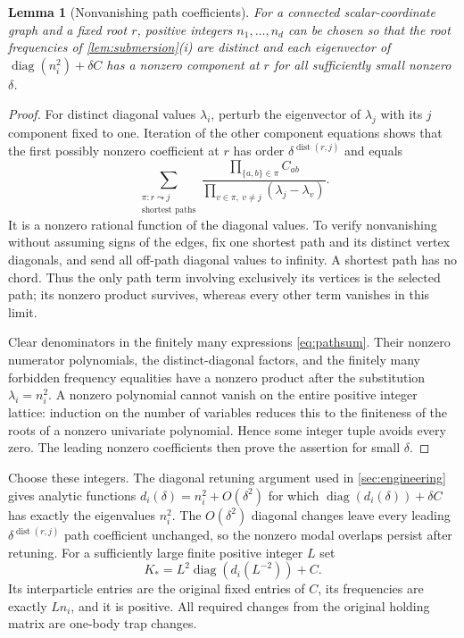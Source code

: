 \documentclass[11pt]{article}
\numberwithin{equation}{section}
\newtheorem{lemma}[lemma]{Lemma}
\theoremstyle{definition}
\newcommand{\diag}{\operatorname{diag}}
\begin{document}
\begin{lemma}[Nonvanishing path coefficients]\label{lem:paths}
For a connected scalar-coordinate graph and a fixed root $r$,
positive integers $n_1,\ldots,n_d$ can be chosen so that the
root frequencies of \cref{lem:submersion}(i) are distinct and
each eigenvector of
$\diag(n_i^2)+\delta C$ has a nonzero component at $r$ for all
sufficiently small nonzero $\delta$.
\end{lemma}

\begin{proof}
For distinct diagonal values $\lambda_i$, perturb the eigenvector
of $\lambda_j$ with its $j$ component fixed to one.
Iteration of the other component equations shows that the first
possibly nonzero coefficient at $r$ has order
$\delta^{\operatorname{dist}(r,j)}$ and equals
\begin{equation}\label{eq:pathsum}
 \sum_{\substack{\pi:r\leadsto j\\\text{shortest paths}}}
 \frac{\prod_{\{a,b\}\in\pi}C_{ab}}
      {\prod_{v\in\pi,\ v\ne j}(\lambda_j-\lambda_v)} .
\end{equation}
It is a nonzero rational function of the diagonal values.
To verify nonvanishing without assuming signs of the edges,
fix one shortest path and its distinct vertex diagonals, and
send all off-path diagonal values to infinity. A shortest path
has no chord. Thus the only path term involving exclusively its
vertices is the selected path; its nonzero product survives,
whereas every other term vanishes in this limit.

Clear denominators in the finitely many expressions
\eqref{eq:pathsum}. Their nonzero numerator polynomials, the
distinct-diagonal factors, and the finitely many forbidden
frequency equalities have a nonzero product after the
substitution $\lambda_i=n_i^2$. A nonzero polynomial cannot
vanish on the entire positive integer lattice: induction on the
number of variables reduces this to the finiteness of the roots
of a nonzero univariate polynomial. Hence some integer tuple
avoids every zero. The leading nonzero coefficients then prove
the assertion for small $\delta$.
\end{proof}

Choose these integers. The diagonal retuning argument used in
\cref{sec:engineering} gives analytic functions
$d_i(\delta)=n_i^2+O(\delta^2)$ for which
$\diag(d_i(\delta))+\delta C$ has exactly the eigenvalues
$n_i^2$. The $O(\delta^2)$ diagonal changes leave every leading
$\delta^{\operatorname{dist}(r,j)}$ path coefficient unchanged,
so the nonzero modal overlaps persist after retuning.
For a sufficiently large finite positive integer $L$ set
\begin{equation}\label{eq:stiffseed}
 K_* = L^2\diag(d_i(L^{-2}))+C .
\end{equation}
Its interparticle entries are the original fixed entries of $C$,
its frequencies are exactly $Ln_i$, and it is positive.
All required changes from the original holding matrix are
one-body trap changes.
\end{document}
